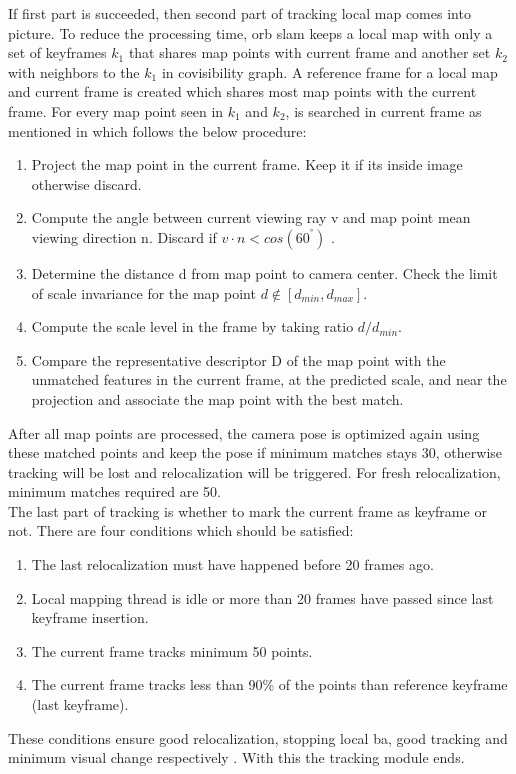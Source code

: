 \linebreak
If first part is succeeded, then second part of tracking local map comes into picture. To reduce the processing time, \acrshort{orb} \acrshort{slam} keeps a local map with only a set of keyframes $ k_{1} $ that shares map points with current frame and another set $k_{2} $ with neighbors to the $ k_{1} $ in covisibility graph. A reference frame for a local map and current frame is created which shares most map points with the current frame. For every map point seen in $ k_{1} $ and $ k_{2} $, is searched in current frame as mentioned in \cite{orbslam} which follows the below procedure: 
\begin{enumerate}
	\item Project the map point in the current frame. Keep it if its inside image otherwise discard.
	\item Compute the angle between current viewing ray v and map point mean viewing
	direction n. Discard if $ v \cdot n < cos(60^{°}) $ .
	\item Determine the distance d from map point to camera center. Check the limit of scale invariance for the map point $ d \notin [d_ {min} , d_{max}] $. 
	\item Compute the scale level in the frame by taking ratio $ d/d_{min} $.
	\item Compare the representative descriptor D of the map point with the unmatched features in the current frame, at the predicted scale, and near the projection and associate the map point with the best match.
\end{enumerate}
After all map points are processed, the camera pose is optimized again using these matched points and keep the pose if minimum matches stays 30, otherwise tracking will be lost and relocalization will be triggered. For fresh relocalization, minimum matches required are 50. \\
\newline
The last part of tracking is whether to mark the current frame as keyframe or not. There are four conditions which should be satisfied:
\begin{enumerate}
	\item The last relocalization must have happened before 20 frames ago.
	\item Local mapping thread is idle or more than 20 frames have passed since last keyframe insertion.
	\item The current frame tracks minimum 50 points.
	\item The current frame tracks less than 90\% of the points than reference keyframe (last keyframe).
\end{enumerate}
These conditions ensure good relocalization, stopping local \acrshort{ba}, good tracking and minimum visual change respectively \cite{orbslam}. With this the tracking module ends. 

